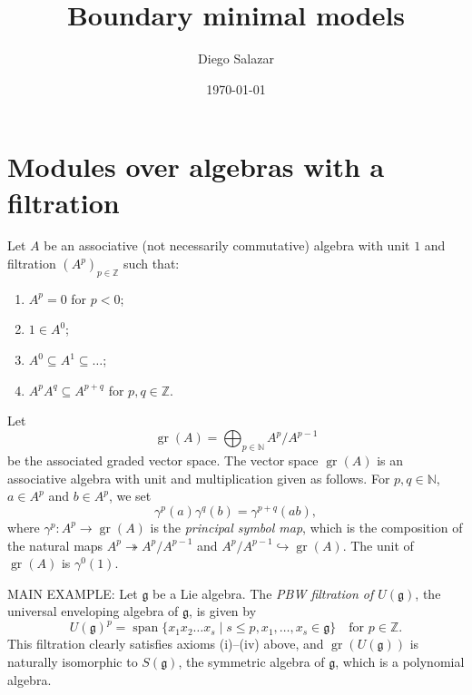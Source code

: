 \documentclass[a4paper, 12pt, reqno]{amsart}
\DeclareMathOperator{\gr}{gr}
\DeclareMathOperator{\vspan}{span}
\begin{document}
\title{Boundary minimal models}
\author{Diego Salazar}
\address{Instituto de Matemática Pura e Aplicada, Rio de Janeiro, RJ, Brazil}
\date{\today}
\maketitle

\section{Modules over algebras with a filtration}
\label{sec:modul-over-algebr}

Let $A$ be an associative (not necessarily commutative) algebra with unit $1$ and filtration $(A^p)_{p \in \mathbb{Z}}$ such that:
\begin{enumerate}
\item $A^p = 0$ for $p < 0$;
\item $1 \in A^0$;
\item $A^0 \subseteq A^1 \subseteq \dots$;
\item $A^pA^q \subseteq A^{p + q}$ for $p, q \in \mathbb{Z}$.
\end{enumerate}
Let
\begin{equation*}
  \gr(A) = \bigoplus_{p \in \mathbb{N}}A^p/A^{p - 1}
\end{equation*}
be the associated graded vector space.
The vector space $\gr(A)$ is an associative algebra with unit and multiplication given as follows.
For $p, q \in \mathbb{N}$, $a \in A^p$ and $b \in A^p$, we set
\begin{equation*}
  \gamma^p(a)\gamma^q(b) = \gamma^{p + q}(ab),
\end{equation*}
where $\gamma^p: A^p \to \gr(A)$ is the \emph{principal symbol map}, which is the composition of the natural maps $A^p \twoheadrightarrow A^p/A^{p - 1}$ and $A^p/A^{p - 1} \hookrightarrow \gr(A)$.
The unit of $\gr(A)$ is $\gamma^0(1)$.

MAIN EXAMPLE: Let $\mathfrak{g}$ be a Lie algebra.
The \emph{PBW filtration of $U(\mathfrak{g})$}, the universal enveloping algebra of $\mathfrak{g}$, is given by
\begin{equation*}
  U(\mathfrak{g})^p = \vspan\{x_1x_2\dots x_s \mid s \le p, x_1, \dots, x_s \in \mathfrak{g}\} \quad \text{for $p \in \mathbb{Z}$}.
\end{equation*}
This filtration clearly satisfies axioms (i)--(iv) above, and $\gr(U(\mathfrak{g}))$ is naturally isomorphic to $S(\mathfrak{g})$, the symmetric algebra of $\mathfrak{g}$, which is a polynomial algebra.
\end{document}

